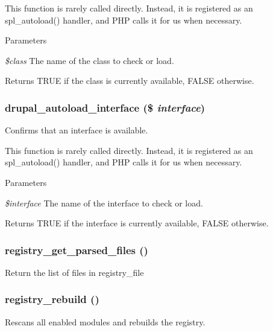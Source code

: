 This function is rarely called directly. Instead, it is registered as an spl\_\-autoload() handler, and PHP calls it for us when necessary.


\begin{DoxyParams}{Parameters}
\item[{\em \$class}]The name of the class to check or load.\end{DoxyParams}
\begin{DoxyReturn}{Returns}
TRUE if the class is currently available, FALSE otherwise. 
\end{DoxyReturn}
\hypertarget{group__registry_gaf7822bbec92566b95a44dc1c224389e8}{
\subsubsection[{drupal\_\-autoload\_\-interface}]{\setlength{\rightskip}{0pt plus 5cm}drupal\_\-autoload\_\-interface (\$ {\em interface})}}
\label{group__registry_gaf7822bbec92566b95a44dc1c224389e8}
Confirms that an interface is available.

This function is rarely called directly. Instead, it is registered as an spl\_\-autoload() handler, and PHP calls it for us when necessary.


\begin{DoxyParams}{Parameters}
\item[{\em \$interface}]The name of the interface to check or load.\end{DoxyParams}
\begin{DoxyReturn}{Returns}
TRUE if the interface is currently available, FALSE otherwise. 
\end{DoxyReturn}
\hypertarget{group__registry_ga072b32f340e117845791d7c6770da0f1}{
\subsubsection[{registry\_\-get\_\-parsed\_\-files}]{\setlength{\rightskip}{0pt plus 5cm}registry\_\-get\_\-parsed\_\-files ()}}
\label{group__registry_ga072b32f340e117845791d7c6770da0f1}
Return the list of files in registry\_\-file \hypertarget{group__registry_ga63939dbdcf7950c97292f7d341f6d339}{
\subsubsection[{registry\_\-rebuild}]{\setlength{\rightskip}{0pt plus 5cm}registry\_\-rebuild ()}}
\label{group__registry_ga63939dbdcf7950c97292f7d341f6d339}
Rescans all enabled modules and rebuilds the registry.


